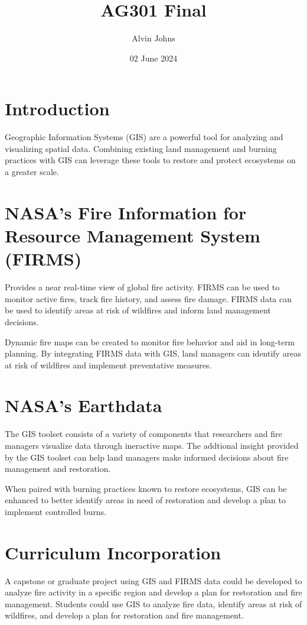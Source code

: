 \documentclass{article}
\title{AG301 Final}
\author{Alvin Johns}
\date{02 June 2024}
\begin{document}
\maketitle

\raggedright

\section*{Introduction}

Geographic Information Systems (GIS) are a powerful tool for analyzing and visualizing spatial data. Combining existing land management and burning practices with GIS can leverage these tools to restore and protect ecosystems on a greater scale.

\section*{NASA's Fire Information for Resource Management System (FIRMS)}
Provides a near real-time view of global fire activity. FIRMS can be used to monitor active fires, track fire history, and assess fire damage. FIRMS data can be used to identify areas at risk of wildfires and inform land management decisions.

Dynamic fire maps can be created to monitor fire behavior and aid in long-term planning. By integrating FIRMS data with GIS, land managers can identify areas at risk of wildfires and implement preventative measures.

\section*{NASA's Earthdata}
The GIS toolset consists of a variety of components that researchers and fire managers visualize data through ineractive maps. The addtional insight provided by the GIS toolset can help land managers make informed decisions about fire management and restoration. 

When paired with burning practices known to restore ecosystems, GIS can be enhanced to better identify areas in need of restoration and develop a plan to implement controlled burns. 


\section*{Curriculum Incorporation}

A capstone or graduate project using GIS and FIRMS data could be developed to analyze fire activity in a specific region and develop a plan for restoration and fire management. Students could use GIS to analyze fire data, identify areas at risk of wildfires, and develop a plan for restoration and fire management.
\end{document}
